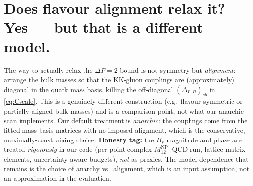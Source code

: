 \documentclass[11pt]{article}
\newcommand{\Bs}{B_s}
\newcommand{\MtwelveNP}{M_{12}^{\mathrm{NP}}}
\theoremstyle{definition}
\begin{document}
\section{Does flavour alignment relax it? Yes --- but that is a different model.}
\label{sec:alignment}

The way to actually relax the $\Delta F=2$ bound is not symmetry but
\emph{alignment}: arrange the bulk masses so that the KK-gluon couplings are
(approximately) diagonal in the quark mass basis, killing the off-diagonal
$(\Delta_{L,R})_{sb}$ in \eqref{eq:Cscale}. This is a genuinely different
construction (e.g.\ flavour-symmetric or partially-aligned bulk masses) and is a
comparison point, not what our anarchic scan implements. Our default treatment is
\emph{anarchic}: the couplings come from the fitted mass-basis matrices with no
imposed alignment, which is the conservative, maximally-constraining choice.
\textbf{Honesty tag:} the $\Bs$ magnitude and phase are treated \emph{rigorously}
in our code (per-point complex $\MtwelveNP$, QCD-run, lattice matrix elements,
uncertainty-aware budgets), \emph{not} as proxies. The model dependence that
remains is the choice of anarchy vs.\ alignment, which is an input assumption, not
an approximation in the evaluation.
\end{document}
